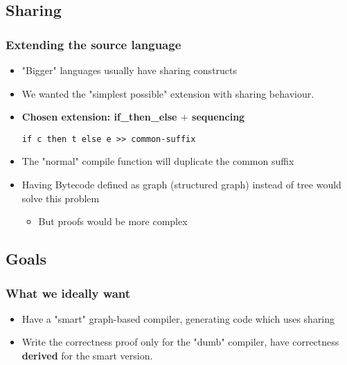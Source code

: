     \subsection{Sharing}
        \begin{frame}
            \frametitle{Extending the source language}

            \begin{itemize}
                \item "Bigger" languages usually have sharing constructs
                \item We wanted the "simplest possible" extension with sharing behaviour.
                \item \textbf{Chosen extension: if\_then\_else $+$ sequencing}
                    \begin{verbatim}
if c then t else e >> common-suffix
                    \end{verbatim}
            \end{itemize}

            \begin{itemize}
                \item The "normal" compile function will duplicate the common suffix
                \item Having Bytecode defined as graph (structured graph) instead of tree
                    would solve this problem
                    \begin{itemize}
                        \item But proofs would be more complex
                    \end{itemize}
            \end{itemize}
        \end{frame}


    \subsection{Goals}
        \begin{frame}
            \frametitle{What we ideally want}
            \begin{itemize}
                \item Have a "smart" graph-based compiler, generating code which uses sharing
                \item Write the correctness proof only for the "dumb" compiler,
                    have correctness \textbf{derived} for the smart version.
              \end{itemize}
        \end{frame}

